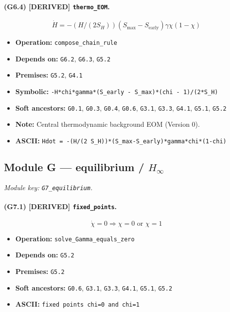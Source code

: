 \documentclass[11pt,a4paper]{article}
\theoremstyle{remark}\newtheorem*{caution}{Caution}
\newcommand{\tagbox}[1]{\textsc{[#1]}}
\begin{document}
\paragraph{(G6.4) \tagbox{DERIVED} \texttt{thermo\_EOM}.}
\begin{equation}
\dot H=-(H/(2S_H))(S_{\max}-S_{\mathrm{early}})\gamma\chi(1-\chi)
\tag{G6.4}
\end{equation}
\begin{itemize}\setlength{\itemsep}{0.12em}
\item \textbf{Operation:} \texttt{compose\_chain\_rule}
\item \textbf{Depends on:} \texttt{G6.2}, \texttt{G6.3}, \texttt{G5.2}
\item \textbf{Premises:} \texttt{G5.2}, \texttt{G4.1}
\item \textbf{Symbolic:} \texttt{-H*chi*gamma*(S\_early - S\_max)*(chi - 1)/(2*S\_H)}
\item \textbf{Soft ancestors:} \texttt{G0.1}, \texttt{G0.3}, \texttt{G0.4}, \texttt{G0.6}, \texttt{G3.1}, \texttt{G3.3}, \texttt{G4.1}, \texttt{G5.1}, \texttt{G5.2}
\item \textbf{Note:} Central thermodynamic background EOM (Version 0).
\item \textbf{ASCII:} \texttt{Hdot = -(H/(2 S\_H))*(S\_max-S\_early)*gamma*chi*(1-chi)}
\end{itemize}
\subsection{Module G --- equilibrium / $H_\infty$}
\textit{Module key: \texttt{G7\_equilibrium}.}
\paragraph{(G7.1) \tagbox{DERIVED} \texttt{fixed\_points}.}
\begin{equation}
\dot\chi=0\Rightarrow\chi=0\text{ or }\chi=1
\tag{G7.1}
\end{equation}
\begin{itemize}\setlength{\itemsep}{0.12em}
\item \textbf{Operation:} \texttt{solve\_Gamma\_equals\_zero}
\item \textbf{Depends on:} \texttt{G5.2}
\item \textbf{Premises:} \texttt{G5.2}
\item \textbf{Soft ancestors:} \texttt{G0.6}, \texttt{G3.1}, \texttt{G3.3}, \texttt{G4.1}, \texttt{G5.1}, \texttt{G5.2}
\item \textbf{ASCII:} \texttt{fixed points chi=0 and chi=1}
\end{itemize}
\end{document}
